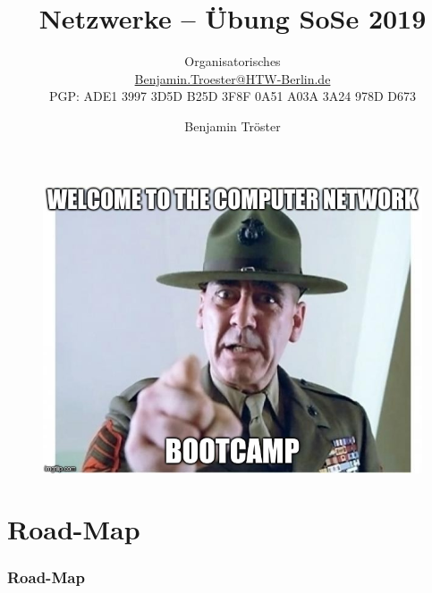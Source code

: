 \documentclass[xcolor=dvipsnames,aspectratio=169]{beamer}
\begin{document}

\title{Netzwerke -- Übung SoSe 2019}
\subtitle{Organisatorisches\\

\href{mailto:Benjamin.Troester@HTW-Berlin.de}{Benjamin.Troester@HTW-Berlin.de}\\
		PGP: ADE1 3997 3D5D B25D 3F8F 0A51 A03A 3A24 978D D673 }

\author{Benjamin Tröster}

\date{}

\begin{frame}\frametitle{}
\begin{figure}[]
\centering
\includegraphics[scale=0.43]{bootcamp}
\end{figure}
\end{frame}

\begin{frame}
\titlepage
\end{frame}

\section*{Road-Map}
\begin{frame}
\frametitle{Road-Map}
\begin{multicols}{2}
  \tableofcontents
\end{multicols}
\end{frame}
\end{document}
